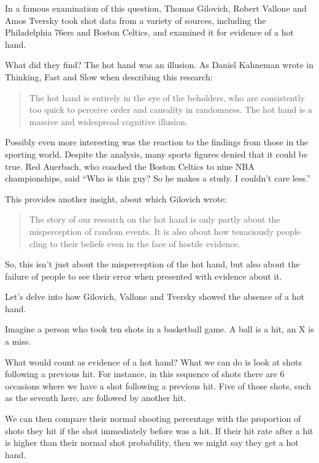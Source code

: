 \documentclass[
]{book}
\begin{document}
In a famous examination of this question, Thomas Gilovich, Robert Vallone and Amos Tversky took shot data from a variety of sources, including the Philadelphia 76ers and Boston Celtics, and examined it for evidence of a hot hand.

What did they find? The hot hand was an illusion. As Daniel Kahneman wrote in Thinking, Fast and Slow when describing this research:

\begin{quote}
The hot hand is entirely in the eye of the beholders, who are consistently too quick to perceive order and causality in randomness. The hot hand is a massive and widespread cognitive illusion.
\end{quote}

Possibly even more interesting was the reaction to the findings from those in the sporting world. Despite the analysis, many sports figures denied that it could be true. Red Auerbach, who coached the Boston Celtics to nine NBA championships, said ``Who is this guy? So he makes a study. I couldn't care less.''

This provides another insight, about which Gilovich wrote:

\begin{quote}
The story of our research on the hot hand is only partly about the misperception of random events. It is also about how tenaciously people cling to their beliefs even in the face of hostile evidence.
\end{quote}

So, this isn't just about the misperception of the hot hand, but also about the failure of people to see their error when presented with evidence about it.

Let's delve into how Gilovich, Vallone and Tversky showed the absence of a hot hand.

Imagine a person who took ten shots in a basketball game. A ball is a hit, an X is a miss.

What would count as evidence of a hot hand? What we can do is look at shots following a previous hit. For instance, in this sequence of shots there are 6 occasions where we have a shot following a previous hit. Five of those shots, such as the seventh here, are followed by another hit.

We can then compare their normal shooting percentage with the proportion of shots they hit if the shot immediately before was a hit. If their hit rate after a hit is higher than their normal shot probability, then we might say they get a hot hand.
\end{document}
